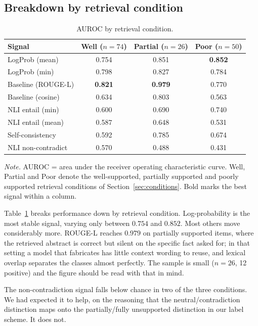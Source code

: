 \documentclass[11pt,a4paper]{article}
\begin{document}
\subsection{Breakdown by retrieval condition}

\begin{table}[htbp]
\centering
\caption{AUROC by retrieval condition.}
\label{tab:condition}
\small
\begin{tabular}{@{}lccc@{}}
\toprule
\textbf{Signal} & \textbf{Well} ($n{=}74$) & \textbf{Partial} ($n{=}26$) &
\textbf{Poor} ($n{=}50$) \\
\midrule
LogProb (mean)      & 0.754 & 0.851 & \textbf{0.852} \\
LogProb (min)       & 0.798 & 0.827 & 0.784 \\
Baseline (ROUGE-L)  & \textbf{0.821} & \textbf{0.979} & 0.770 \\
Baseline (cosine)   & 0.634 & 0.803 & 0.563 \\
NLI entail (min)    & 0.600 & 0.690 & 0.740 \\
NLI entail (mean)   & 0.587 & 0.648 & 0.531 \\
Self-consistency    & 0.592 & 0.785 & 0.674 \\
NLI non-contradict  & 0.570 & 0.488 & 0.431 \\
\bottomrule
\end{tabular}
\smallskip
\begin{minipage}{\linewidth}
\footnotesize \raggedright
\textit{Note.} AUROC = area under the receiver operating characteristic curve. Well, Partial and Poor denote the well-supported, partially supported and poorly supported retrieval conditions of Section~\ref{sec:conditions}. Bold marks the best signal within a column.
\end{minipage}
\end{table}

Table~\ref{tab:condition} breaks performance down by retrieval condition.
Log-probability is the most stable signal, varying only
between $0.754$ and $0.852$. Most others move considerably more. ROUGE-L reaches
$0.979$ on partially supported items, where the retrieved abstract is correct
but silent on the specific fact asked for; in that setting a model that
fabricates has little context wording to reuse, and lexical overlap separates
the classes almost perfectly. The sample is small ($n = 26$, 12 positive) and the
figure should be read with that in mind.

The non-contradiction signal falls below chance in two of the three conditions.
We had expected it to help, on the reasoning that the neutral/contradiction
distinction maps onto the partially/fully unsupported distinction in our label
scheme. It does not.
\end{document}
